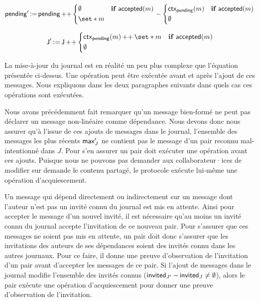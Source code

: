 \begin{equation*}
    \trm{pending}' \assign \trm{pending} \lappend \begin{dcases}
        \emptyset & \when \trm{accepted}(m)\\
        \set*{m}
    \end{dcases} \sminus \begin{dcases}
        \trm{ctx}_{\trm{pending}}(m) & \when \trm{accepted}(m)\\
        \emptyset
    \end{dcases}
\end{equation*}

\begin{equation*}
    \trm{J}' \assign \trm{J} \lappend \begin{dcases}
        \trm{ctx}_{\trm{pending}}(m) \lappend \set*{m} & \when \trm{accepted}(m)\\
        \emptyset
    \end{dcases}
\end{equation*}

La mise-à-jour du journal est en réalité un peu plus complexe que l'équation présentée ci-dessus.
Une opération peut être exécutée avant et après l'ajout de ces messages.
Nous expliquons dans les deux paragraphes suivants dans quels cas ces opérations sont exécutées.

Nous avons précédemment fait remarquer qu'un message bien-formé ne peut pas déclarer un message non-linéaire comme dépendance.
Nous devons donc nous assurer qu'à l'issue de ces ajouts de messages dans le journal, l'ensemble des messages les plus récents $\operatorname{\mathsf{max}}_J'$ ne contient pas le message d'un pair reconnu mal-intentionné dans $J$.
Pour s'en assurer un pair doit exécuter une opération avant ces ajouts.
Puisque nous ne pouvons pas demander aux collaborateur·ices de modifier sur demande le contenu partagé, le protocole exécute lui-même une opération d'acquiescement.


Un message qui dépend directement ou indirectement sur un message dont l'auteur n'est pas un invité connu du journal est mis en attente.
Ainsi pour accepter le message d'un nouvel invité, il est nécessaire qu'au moins un invité connu du journal accepte l'invitation de ce nouveau pair.
Pour s'assurer que ces messages ne soient pas mis en attente, un pair doit donc s'assurer que les invitations des auteurs de ses dépendances soient des invités connu dans les autres journaux.
Pour ce faire, il donne une preuve d'observation de l'invitation d'un pair avant d'accepter les messages de ce pair.
Si l'ajout de messages dans le journal modifie l'ensemble des invités connus ($\operatorname{\mathsf{invited}}_{J'} - \operatorname{\mathsf{invited}}_J \neq \emptyset$), alors le pair exécute une opération d'acquiescement pour donner une preuve d'observation de l'invitation.



